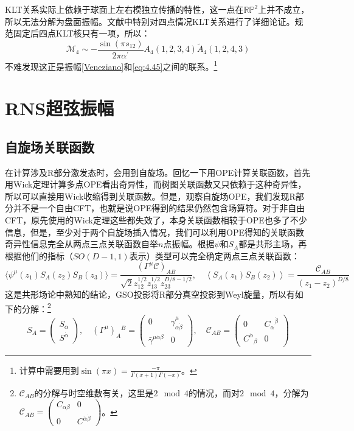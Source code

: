 KLT关系实际上依赖于球面上左右模独立传播的特性，这一点在$\mathbb{RP}^2$上并不成立，所以无法分解为盘面振幅\cite{dyj}。文献\cite{Kawai:1985xq}中特别对四点情况KLT关系进行了详细论证。规范固定后四点KLT核只有一项，所以：
\begin{equation}
	\mathcal{M}_4 \sim-\frac{\sin(\pi s_{12})}{2\pi\alpha^{\prime}}A_4(1,2,3,4)\tilde A_4(1,2,4,3)
\end{equation}
不难发现这正是振幅\ref{Veneziano}和\ref{eq:4.45}之间的联系。\footnote{计算中需要用到$\sin(\pi x) = \frac{-\pi}{\Gamma(x+1)\Gamma(-x)}$。}
\section{RNS超弦振幅}
\subsection{自旋场关联函数}
在计算涉及R部分激发态时，会用到自旋场。回忆一下用OPE计算关联函数，首先用Wick定理计算多点OPE看出奇异性，而树图关联函数又只依赖于这种奇异性，所以可以直接用Wick收缩得到关联函数。但是，观察自旋场OPE，我们发现R部分并不是一个自由CFT，也就是说OPE得到的结果仍然包含场算符。对于非自由CFT，原先使用的Wick定理这些都失效了，本身关联函数相较于OPE也多了不少信息，但是，至少对于两个自旋场插入情况，我们可以利用OPE得知的关联函数奇异性信息完全从两点三点关联函数自举$n$点振幅。根据$\psi$和$S_A$都是共形主场，再根据他们的指标（$SO(D-1,1)$表示）类型可以完全确定两点三点关联函数：
\begin{equation}
	\label{eq:4.61}
	\langle\psi^\mu(z_1)S_A(z_2)S_B(z_3)\rangle=\frac{(\Gamma^\mu\mathcal{C})_{AB}}{\sqrt{2}z_{12}^{1/2}z_{13}^{1/2}z_{23}^{D/8-1/2}},\quad \left\langle{S_{A}(z_1)S_{B}(z_2)}\right\rangle=\frac{\mathcal{C}_{AB}}{(z_1-z_2)^{D/8}}
\end{equation}
这是共形场论中熟知的结论，GSO投影将R部分真空投影到Weyl旋量，所以有如下的分解：\footnote{$\mathcal{C}_{AB}$的分解与时空维数有关，这里是$2\mod 4$的情况，而对$2\mod 4$，分解为$\mathcal{C}_{AB}=\begin{pmatrix}C_{\alpha\beta}&0\\0&C^{\dot{\alpha}\dot{\beta}}\end{pmatrix}$。}
\begin{equation}
	\label{eq:4.65}
	S_A=\begin{pmatrix}S_\alpha\\S^{\dot{\alpha}}\end{pmatrix},\quad(\Gamma^\mu)_A{}^B=\begin{pmatrix}0&\gamma_{\alpha\dot{\beta}}^\mu\\\bar{\gamma}^{\mu\dot{\alpha}\beta}&0\end{pmatrix},\quad \mathcal{C}_{AB}=\begin{pmatrix}0&{C_{\alpha}}^{\dot{\beta}}\\{C^{\dot{\alpha}}}_{\beta}&0\end{pmatrix}
\end{equation}
